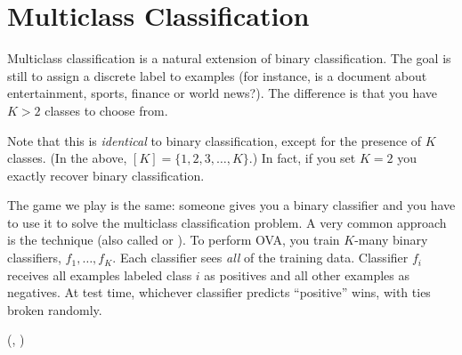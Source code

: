 
\section{Multiclass Classification}

Multiclass classification is a natural extension of binary
classification.  The goal is still to assign a discrete label to
examples (for instance, is a document about entertainment, sports,
finance or world news?).  The difference is that you have $K>2$
classes to choose from.


Note that this is \emph{identical} to binary classification, except
for the presence of $K$ classes.  (In the above, $[K] =
\{1,2,3,\dots,K\}$.)  In fact, if you set $K=2$ you exactly recover
binary classification.

The game we play is the same: someone gives you a binary classifier
and you have to use it to solve the multiclass classification problem.
A very common approach is the  technique (also
called  or ).  To perform OVA,
you train $K$-many binary classifiers, $f_1, \dots, f_K$.  Each
classifier sees \emph{all} of the training data.  Classifier $f_i$
receives all examples labeled class $i$ as positives and all other
examples as negatives.  At test time, whichever classifier predicts
``positive'' wins, with ties broken randomly.


  {(, )}
  {
\ENDFOR
{}
}

